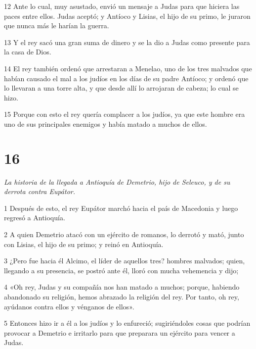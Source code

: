 \par 12 Ante lo cual, muy asustado, envió un mensaje a Judas para que hiciera las paces entre ellos. Judas aceptó; y Antíoco y Lisias, el hijo de su primo, le juraron que nunca más le harían la guerra.

\par 13 Y el rey sacó una gran suma de dinero y se la dio a Judas como presente para la casa de Dios.

\par 14 El rey también ordenó que arrestaran a Menelao, uno de los tres malvados que habían causado el mal a los judíos en los días de su padre Antíoco; y ordenó que lo llevaran a una torre alta, y que desde allí lo arrojaran de cabeza; lo cual se hizo.

\par 15 Porque con esto el rey quería complacer a los judíos, ya que este hombre era uno de sus principales enemigos y había matado a muchos de ellos.

\chapter{16}

\par \textit{La historia de la llegada a Antioquía de Demetrio, hijo de Seleuco, y de su derrota contra Eupátor.}

\par 1 Después de esto, el rey Eupátor marchó hacia el país de Macedonia y luego regresó a Antioquía.

\par 2 A quien Demetrio atacó con un ejército de romanos, lo derrotó y mató, junto con Lisias, el hijo de su primo; y reinó en Antioquía.

\par 3 ¿Pero fue hacia él Alcimo, el líder de aquellos tres? hombres malvados; quien, llegando a su presencia, se postró ante él, lloró con mucha vehemencia y dijo;

\par 4 «Oh rey, Judas y su compañía nos han matado a muchos; porque, habiendo abandonado su religión, hemos abrazado la religión del rey. Por tanto, oh rey, ayúdanos contra ellos y vénganos de ellos».

\par 5 Entonces hizo ir a él a los judíos y lo enfureció; sugiriéndoles cosas que podrían provocar a Demetrio e irritarlo para que preparara un ejército para vencer a Judas.

